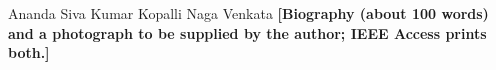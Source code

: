 \documentclass{ieeeaccess}
\begin{document}



\begin{IEEEbiographynophoto}{Ananda Siva Kumar Kopalli Naga Venkata}
\textbf{[Biography (about 100 words) and a photograph to be supplied by the author; IEEE Access prints both.]}
\end{IEEEbiographynophoto}

\EOD
\end{document}
